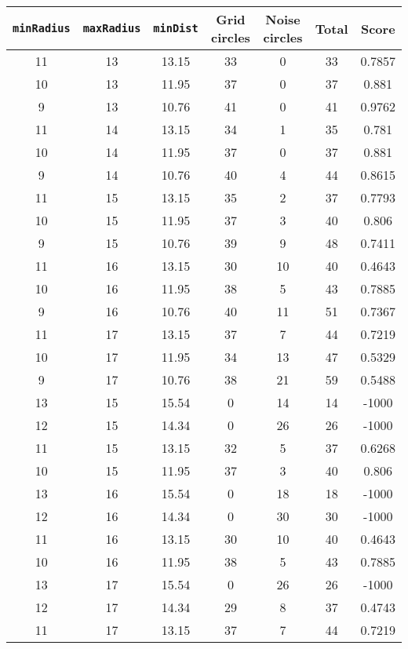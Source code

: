 \documentclass[letterpaper, 12pt]{article}
\begin{document}
\begin{longtable}{|c|c|c|c|c|c|c|}
\hline
\textbf{\texttt{minRadius}} & \textbf{\texttt{maxRadius}} & \textbf{\texttt{minDist}} & \textbf{Grid circles} & \textbf{Noise circles} & \textbf{Total} & \textbf{Score} \\
\hline
11 & 13 & 13.15 & 33 & 0 & 33 & 0.7857 \\
\hline
10 & 13 & 11.95 & 37 & 0 & 37 & 0.881 \\
\hline
9 & 13 & 10.76 & 41 & 0 & 41 & 0.9762 \\
\hline
11 & 14 & 13.15 & 34 & 1 & 35 & 0.781 \\
\hline
10 & 14 & 11.95 & 37 & 0 & 37 & 0.881 \\
\hline
9 & 14 & 10.76 & 40 & 4 & 44 & 0.8615 \\
\hline
11 & 15 & 13.15 & 35 & 2 & 37 & 0.7793 \\
\hline
10 & 15 & 11.95 & 37 & 3 & 40 & 0.806 \\
\hline
9 & 15 & 10.76 & 39 & 9 & 48 & 0.7411 \\
\hline
11 & 16 & 13.15 & 30 & 10 & 40 & 0.4643 \\
\hline
10 & 16 & 11.95 & 38 & 5 & 43 & 0.7885 \\
\hline
9 & 16 & 10.76 & 40 & 11 & 51 & 0.7367 \\
\hline
11 & 17 & 13.15 & 37 & 7 & 44 & 0.7219 \\
\hline
10 & 17 & 11.95 & 34 & 13 & 47 & 0.5329 \\
\hline
9 & 17 & 10.76 & 38 & 21 & 59 & 0.5488 \\
\hline
13 & 15 & 15.54 & 0 & 14 & 14 & -1000 \\
\hline
12 & 15 & 14.34 & 0 & 26 & 26 & -1000 \\
\hline
11 & 15 & 13.15 & 32 & 5 & 37 & 0.6268 \\
\hline
10 & 15 & 11.95 & 37 & 3 & 40 & 0.806 \\
\hline
13 & 16 & 15.54 & 0 & 18 & 18 & -1000 \\
\hline
12 & 16 & 14.34 & 0 & 30 & 30 & -1000 \\
\hline
11 & 16 & 13.15 & 30 & 10 & 40 & 0.4643 \\
\hline
10 & 16 & 11.95 & 38 & 5 & 43 & 0.7885 \\
\hline
13 & 17 & 15.54 & 0 & 26 & 26 & -1000 \\
\hline
12 & 17 & 14.34 & 29 & 8 & 37 & 0.4743 \\
\hline
11 & 17 & 13.15 & 37 & 7 & 44 & 0.7219 \\
\hline

\end{longtable}
\end{document}
